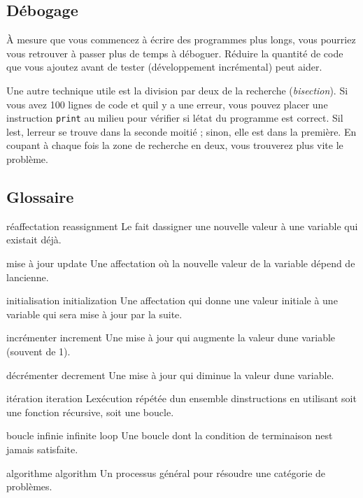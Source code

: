 \hypertarget{duxe9bogage}{%
\subsection{Débogage}\label{duxe9bogage}}

À mesure que vous commencez à écrire des programmes plus longs, vous
pourriez vous retrouver à passer plus de temps à déboguer. Réduire la
quantité de code que vous ajoutez avant de tester (développement
incrémental) peut aider.

Une autre technique utile est la division par deux de la recherche
(\emph{bisection}). Si vous avez 100 lignes de code et
qu\textquotesingle il y a une erreur, vous pouvez placer une instruction
\texttt{print} au milieu pour vérifier si l\textquotesingle état du
programme est correct. S\textquotesingle il l\textquotesingle est,
l\textquotesingle erreur se trouve dans la seconde moitié ; sinon, elle
est dans la première. En coupant à chaque fois la zone de recherche en
deux, vous trouverez plus vite le problème.

\hypertarget{glossaire}{%
\subsection{Glossaire}\label{glossaire}}

réaffectation reassignment Le fait d\textquotesingle assigner une
nouvelle valeur à une variable qui existait déjà.

mise à jour update Une affectation où la nouvelle valeur de la variable
dépend de l\textquotesingle ancienne.

initialisation initialization Une affectation qui donne une valeur
initiale à une variable qui sera mise à jour par la suite.

incrémenter increment Une mise à jour qui augmente la valeur
d\textquotesingle une variable (souvent de 1).

décrémenter decrement Une mise à jour qui diminue la valeur
d\textquotesingle une variable.

itération iteration L\textquotesingle exécution répétée
d\textquotesingle un ensemble d\textquotesingle instructions en
utilisant soit une fonction récursive, soit une boucle.

boucle infinie infinite loop Une boucle dont la condition de terminaison
n\textquotesingle est jamais satisfaite.

algorithme algorithm Un processus général pour résoudre une catégorie de
problèmes.


